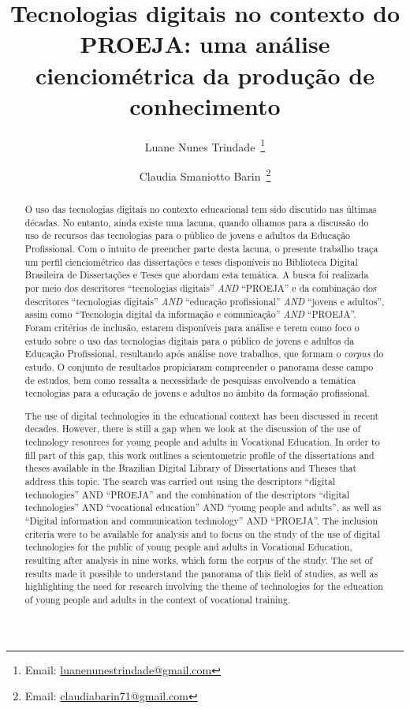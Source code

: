\documentclass[portuguese]{textolivre}
\title{Tecnologias digitais no contexto do PROEJA: uma análise cienciométrica da produção de conhecimento}
\author[1]{Luane Nunes Trindade~\orcid{0009-0002-8760-1628}\thanks{Email: \href{mailto:luanenunestrindade@gmail.com}{luanenunestrindade@gmail.com}}}
\author[2]{Claudia Smaniotto Barin~\orcid{0000-0002-6549-5476}\thanks{Email: \href{mailto:claudiabarin71@gmail.com}{claudiabarin71@gmail.com}}}
\affil[1]{Universidade Federal de Santa Maria, Programa de Pós-graduação em Educação Profissional e Tecnológica, Santa Maria, RS, Brasil.}
\affil[2]{Universidade Federal de Santa Maria, Departamento de Química, Santa Maria, RS, Brasil.}
\begin{document}
\maketitle
\begin{polyabstract}
\begin{abstract}
O uso das tecnologias digitais no contexto educacional
tem sido discutido nas últimas décadas. No entanto, ainda existe uma
lacuna, quando olhamos para a discussão do uso de recursos das
tecnologias para o público de jovens e adultos da Educação Profissional.
Com o intuito de preencher parte desta lacuna, o presente trabalho traça
um perfil cienciométrico das dissertações e teses disponíveis no
Biblioteca Digital Brasileira de Dissertações e Teses que abordam esta
temática. A busca foi realizada por meio dos descritores ``tecnologias
digitais'' \emph{AND} ``PROEJA'' e da combinação dos descritores
``tecnologias digitais'' \emph{AND} ``educação profissional'' \emph{AND}
``jovens e adultos'', assim como ``Tecnologia digital da informação e
comunicação'' \emph{AND} ``PROEJA''. Foram critérios de inclusão,
estarem disponíveis para análise e terem como foco o estudo sobre o uso
das tecnologias digitais para o público de jovens e adultos da Educação
Profissional, resultando após análise nove trabalhos, que formam o
\emph{corpus} do estudo. O conjunto de resultados propiciaram
compreender o panorama desse campo de estudos, bem como ressalta a
necessidade de pesquisas envolvendo a temática tecnologias para a
educação de jovens e adultos no âmbito da formação profissional.

\end{abstract}

\begin{english}
\begin{abstract}
The use of digital technologies in the educational
context has been discussed in recent decades. However, there is still a
gap when we look at the discussion of the use of technology resources
for young people and adults in Vocational Education. In order to fill
part of this gap, this work outlines a scientometric profile of the
dissertations and theses available in the Brazilian Digital Library of
Dissertations and Theses that address this topic. The search was carried
out using the descriptors ``digital technologies'' AND ``PROEJA'' and
the combination of the descriptors ``digital technologies'' AND
``vocational education'' AND ``young people and adults'', as well as
``Digital information and communication technology'' AND ``PROEJA''. The
inclusion criteria were to be available for analysis and to focus on the
study of the use of digital technologies for the public of young people
and adults in Vocational Education, resulting after analysis in nine
works, which form the corpus of the study. The set of results made it
possible to understand the panorama of this field of studies, as well as
highlighting the need for research involving the theme of technologies
for the education of young people and adults in the context of
vocational training.




\end{abstract}
\end{english}
\end{polyabstract}
\end{document}
